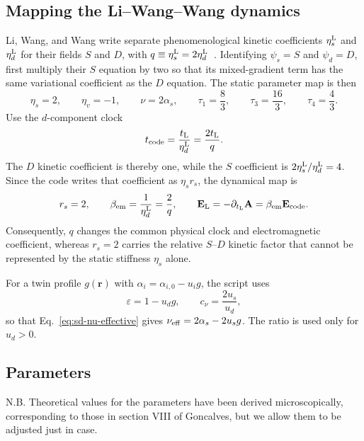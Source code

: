 \documentclass[11pt]{article}
\begin{document}
\subsection{Mapping the Li--Wang--Wang dynamics}

Li, Wang, and Wang write separate phenomenological kinetic coefficients
$\eta_s^{\rm L}$ and $\eta_d^{\rm L}$ for their fields $S$ and $D$, with
$q\equiv\eta_s^{\rm L}=2\eta_d^{\rm L}$~\cite{Li1999}.  Identifying
$\psi_s=S$ and $\psi_d=D$, first multiply their $S$ equation by two so that
its mixed-gradient term has the same variational coefficient as the $D$
equation.  The static parameter map is then
\begin{equation}
  \eta_s=2,\qquad \eta_v=-1,\qquad \nu=2\alpha_s,\qquad
  \tau_1=\frac83,\qquad \tau_3=\frac{16}{3},\qquad
  \tau_4=\frac43.
  \label{eq:li-static-map}
\end{equation}
Use the $d$-component clock
\begin{equation}
  t_{\rm code}=\frac{t_{\rm L}}{\eta_d^{\rm L}}
              =\frac{2t_{\rm L}}{q}.
\end{equation}
The $D$ kinetic coefficient is thereby one, while the $S$ coefficient is
$2\eta_s^{\rm L}/\eta_d^{\rm L}=4$.  Since the code writes that coefficient
as $\eta_s r_s$, the dynamical map is
\begin{equation}
  r_s=2,\qquad \beta_{\rm em}=\frac{1}{\eta_d^{\rm L}}=\frac{2}{q},
  \qquad
  \mathbf E_{\rm L}=-\partial_{t_{\rm L}}\mathbf A
       =\beta_{\rm em}\mathbf E_{\rm code}.
  \label{eq:li-dynamic-map}
\end{equation}
Consequently, $q$ changes the common physical clock and electromagnetic
coefficient, whereas $r_s=2$ carries the relative $S$--$D$ kinetic factor
that cannot be represented by the static stiffness $\eta_s$ alone.

For a twin profile $g(\mathbf r)$ with
$\alpha_i=\alpha_{i,0}-u_i g$, the script uses
\begin{equation}
  \varepsilon=1-u_dg,\qquad c_\nu=\frac{2u_s}{u_d},
\end{equation}
so that Eq.~\eqref{eq:sd-nu-effective} gives
$\nu_{\rm eff}=2\alpha_s-2u_sg$.  The ratio is used only for $u_d>0$.

\subsection{Parameters}

N.B. Theoretical values for the parameters have been derived microscopically, corresponding to those in section VIII of Goncalves, but we allow them to be adjusted just in case.
\end{document}
